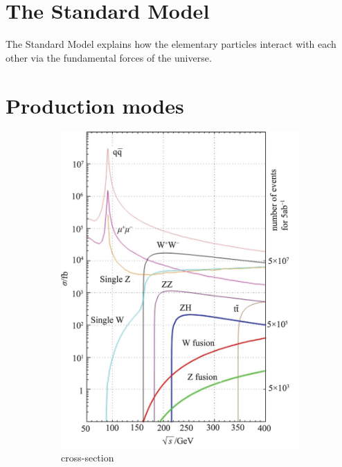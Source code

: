 \section{The Standard Model}
\label{StandardModel}
The Standard Model explains how the elementary particles interact with each other via the fundamental forces of the universe.

\section{Production modes}
\label{Production_modes}

\begin{figure}
\centering
\begin{subfigure}[b]{0.4\textwidth}
\includegraphics[width=\textwidth]{Figures/ILC_cross_section.png}
\caption{\positron \electron cross-section~\cite{ILC_cross}}
\end{subfigure}
\begin{subfigure}[b]{0.4\textwidth}

\end{subfigure}
\end{figure}
